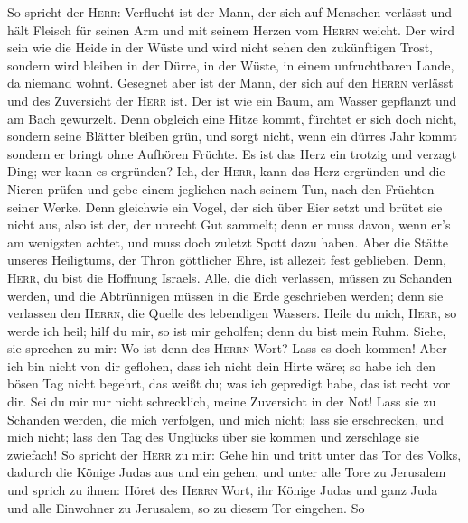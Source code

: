  So spricht der \textsc{Herr}: Verflucht ist der Mann, der
sich auf Menschen verlässt und hält Fleisch für seinen Arm und mit
seinem Herzen vom \textsc{Herrn} weicht.  Der wird sein
wie die Heide in der Wüste und wird nicht sehen den zukünftigen Trost,
sondern wird bleiben in der Dürre, in der Wüste, in einem unfruchtbaren
Lande, da niemand wohnt.  Gesegnet aber ist der Mann, der
sich auf den \textsc{Herrn} verlässt und des Zuversicht der
\textsc{Herr} ist.  Der ist wie ein Baum, am Wasser
gepflanzt und am Bach gewurzelt. Denn obgleich eine Hitze kommt,
fürchtet er sich doch nicht, sondern seine Blätter bleiben grün, und
sorgt nicht, wenn ein dürres Jahr kommt sondern er bringt ohne Aufhören
Früchte.  Es ist das Herz ein trotzig und verzagt Ding;
wer kann es ergründen?  Ich, der \textsc{Herr}, kann das
Herz ergründen und die Nieren prüfen und gebe einem jeglichen nach
seinem Tun, nach den Früchten seiner Werke.  Denn
gleichwie ein Vogel, der sich über Eier setzt und brütet sie nicht aus,
also ist der, der unrecht Gut sammelt; denn er muss davon, wenn er's am
wenigsten achtet, und muss doch zuletzt Spott dazu haben.
 Aber die Stätte unseres Heiligtums, der Thron göttlicher
Ehre, ist allezeit fest geblieben.  Denn, \textsc{Herr},
du bist die Hoffnung Israels. Alle, die dich verlassen, müssen zu
Schanden werden, und die Abtrünnigen müssen in die Erde geschrieben
werden; denn sie verlassen den \textsc{Herrn}, die Quelle des lebendigen
Wassers.  Heile du mich, \textsc{Herr}, so werde ich
heil; hilf du mir, so ist mir geholfen; denn du bist mein Ruhm.
 Siehe, sie sprechen zu mir: Wo ist denn des
\textsc{Herrn} Wort? Lass es doch kommen!  Aber ich bin
nicht von dir geflohen, dass ich nicht dein Hirte wäre; so habe ich den
bösen Tag nicht begehrt, das weißt du; was ich gepredigt habe, das ist
recht vor dir.  Sei du mir nur nicht schrecklich, meine
Zuversicht in der Not!  Lass sie zu Schanden werden, die
mich verfolgen, und mich nicht; lass sie erschrecken, und mich nicht;
lass den Tag des Unglücks über sie kommen und zerschlage sie zwiefach!
 So spricht der \textsc{Herr} zu mir: Gehe hin und tritt
unter das Tor des Volks, dadurch die Könige Judas aus und ein gehen, und
unter alle Tore zu Jerusalem  und sprich zu ihnen: Höret
des \textsc{Herrn} Wort, ihr Könige Judas und ganz Juda und alle
Einwohner zu Jerusalem, so zu diesem Tor eingehen.  So
